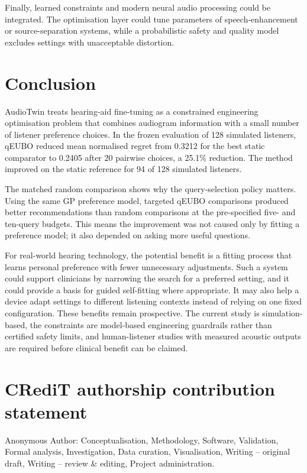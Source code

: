 \documentclass[preprint,12pt]{elsarticle}
\begin{document}
Finally, learned constraints and modern neural audio processing could be integrated. The optimisation layer could tune parameters of speech-enhancement or source-separation systems, while a probabilistic safety and quality model excludes settings with unacceptable distortion.

\section{Conclusion}
\label{sec:conclusion}

AudioTwin treats hearing-aid fine-tuning as a constrained engineering optimisation problem that combines audiogram information with a small number of listener preference choices. In the frozen evaluation of 128 simulated listeners, qEUBO reduced mean normalised regret from 0.3212 for the best static comparator to 0.2405 after 20 pairwise choices, a 25.1\% reduction. The method improved on the static reference for 94 of 128 simulated listeners.

The matched random comparison shows why the query-selection policy matters. Using the same GP preference model, targeted qEUBO comparisons produced better recommendations than random comparisons at the pre-specified five- and ten-query budgets. This means the improvement was not caused only by fitting a preference model; it also depended on asking more useful questions.

For real-world hearing technology, the potential benefit is a fitting process that learns personal preference with fewer unnecessary adjustments. Such a system could support clinicians by narrowing the search for a preferred setting, and it could provide a basis for guided self-fitting where appropriate. It may also help a device adapt settings to different listening contexts instead of relying on one fixed configuration. These benefits remain prospective. The current study is simulation-based, the constraints are model-based engineering guardrails rather than certified safety limits, and human-listener studies with measured acoustic outputs are required before clinical benefit can be claimed.

\section*{CRediT authorship contribution statement}
Anonymous Author: Conceptualisation, Methodology, Software, Validation, Formal analysis, Investigation, Data curation, Visualisation, Writing -- original draft, Writing -- review \& editing, Project administration.
\end{document}

